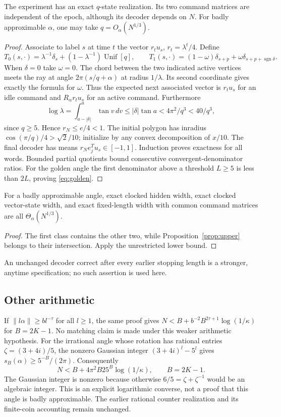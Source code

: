 \begin{proposition}\label{prop:upper}
The experiment has an exact $q$-state realization. Its two command
matrices are independent of the epoch, although its decoder depends on
$N$. For badly approximable $\alpha$, one may take
$q=O_\alpha(N^{1/3})$.
\end{proposition}
\begin{proof}
Associate to label $s$ at time $t$ the vector
$r_tu_s$, $r_t=\lambda^t/4$. Define
\[
 T_0(s,\cdot)=\lambda^{-1}\delta_s+
                     (1-\lambda^{-1})\operatorname{Unif}[q],
 \qquad
 T_1(s,\cdot)=(1-\omega)\delta_{s+p}
                   +\omega\delta_{s+p+\operatorname{sgn}\delta}.
\]
When $\delta=0$ take $\omega=0$. The chord between the two indicated
active vertices meets the ray at angle $2\pi(s/q+\alpha)$ at radius
$1/\lambda$. Its second coordinate gives exactly the formula for
$\omega$. Thus the expected next associated vector is $r_tu_s$ for
an idle command and $R_\alpha r_tu_s$ for an active command.
Furthermore
\[
 \log\lambda=\int_{a-|\delta|}^{a}\tan v\,dv
 \le |\delta|\tan a<4\pi^2/q^3<40/q^3,
\]
since $q\ge5$. Hence $r_N\le e/4<1$.
The initial polygon has inradius $\cos(\pi/q)/4>\sqrt2/10$;
initialize by any convex decomposition of $x/10$. The final decoder
has means $r_Ne_j^Tu_s\in[-1,1]$. Induction proves exactness for all
words. Bounded partial quotients bound consecutive convergent-denominator
ratios. For the golden angle the first denominator above a threshold
$L\ge5$ is less than $2L$, proving \eqref{eq:golden}.
\end{proof}

\begin{corollary}
\label{cor:common-row}
For a badly approximable angle, exact clocked hidden width, exact
clocked vector-state width, and exact fixed-length width with common
command matrices are all $\Theta_\alpha(N^{1/3})$.
\end{corollary}
\begin{proof}
The first class contains the other two, while Proposition~\ref{prop:upper}
belongs to their intersection. Apply the unrestricted lower bound.
\end{proof}
An unchanged decoder correct after every earlier stopping length is a
stronger, anytime specification; no such assertion is used here.

\subsection{Other arithmetic}
If $\|l\alpha\|\ge b l^{-\tau}$ for all $l\ge1$, the same proof gives
$N<B+b^{-2}B^{2\tau+1}\log(1/\kappa)$ for $B=2K-1$.
No matching claim is made under this weaker arithmetic hypothesis.
For the irrational angle whose rotation has rational entries
$\zeta=(3+4i)/5$, the nonzero Gaussian integer $(3+4i)^l-5^l$ gives
$s_B(\alpha)\ge5^{-B}/(2\pi)$. Consequently
\[
 N<B+4\pi^2B25^B\log(1/\kappa),\qquad B=2K-1.
\]
The Gaussian integer is nonzero because otherwise $6/5=\zeta+\zeta^{-1}$
would be an algebraic integer. This is an explicit logarithmic converse,
not a proof that this angle is badly approximable. The earlier rational
counter realization and its finite-coin accounting remain unchanged.
